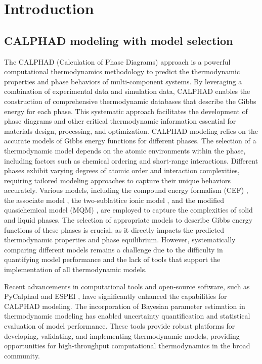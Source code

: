 \chapter{Introduction} \label{sec:Introduction}

\section{CALPHAD modeling with model selection} \label{intro:sec:calphad}
The CALPHAD (Calculation of Phase Diagrams) approach \cite{liu2020computational, lukas2007computational} is a powerful computational thermodynamics methodology to predict the thermodynamic properties and phase behaviors of multi-component systems. By leveraging a combination of experimental data and simulation data, CALPHAD enables the construction of comprehensive thermodynamic databases that describe the Gibbs energy for each phase. This systematic approach facilitates the development of phase diagrams and other critical thermodynamic information essential for materials design, processing, and optimization. CALPHAD modeling relies on the accurate models of Gibbs energy functions for different phases. The selection of a thermodynamic model depends on the atomic environments within the phase, including factors such as chemical ordering and short-range interactions. Different phases exhibit varying degrees of atomic order and interaction complexities, requiring tailored modeling approaches to capture their unique behaviors accurately.  Various models, including the compound energy formalism (CEF) \cite{hillert1970regular}, the associate model \cite{sommer1982association}, the two-sublattice ionic model \cite{hillert1985two}, and the modified quasichemical model (MQM) \cite{pelton2018phase}, are employed to capture the complexities of solid and liquid phases. The selection of appropriate models to describe Gibbs energy functions of these phases is crucial, as it directly impacts the predicted thermodynamic properties and phase equilibrium.  However, systematically comparing different models remains a challenge due to the difficulty in quantifying model performance and the lack of tools that support the implementation of all thermodynamic models.

Recent advancements in computational tools and open-source software, such as PyCalphad \cite{otis2017pycalphad} and ESPEI \cite{bocklund2019espei}, have significantly enhanced the capabilities for CALPHAD modeling. The incorporation of Bayesian parameter estimation in thermodynamic modeling has enabled uncertainty quantification and statistical evaluation of model performance. These tools provide robust platforms for developing, validating, and implementing thermodynamic models, providing opportunities for high-throughput computational thermodynamics in the broad community.

